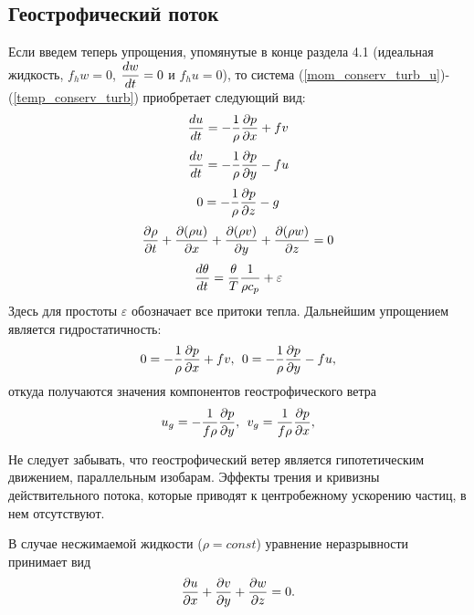 \subsection{{\color{done}Геострофический поток}} \label{section:geostrophic}
    Если введем теперь упрощения, упомянутые в конце раздела 4.1 (идеальная жидкость, $f_h w = 0$, $\displaystyle\frac{d w}{d t}=0$ и $f_h u = 0$), то система (\ref{mom_conserv_turb_u})-(\ref{temp_conserv_turb}) приобретает следующий вид:
    \begin{equation}
    \label{eq:DuDt_geost}
        \displaystyle\frac{d u}{d t} = -\frac{1}{\rho}\displaystyle\frac{\partial p}{\partial x}+fv 
    \end{equation} 
    \begin{equation}
    \label{eq:DvDt_geost}
        \displaystyle\frac{d v}{d t} = -\frac{1}{\rho}\displaystyle\frac{\partial p}{\partial y}-fu 
    \end{equation} 
    \begin{equation}
        0 = -\frac{1}{\rho}\displaystyle\frac{\partial p}{\partial z}-g 
    \end{equation} 
    \begin{equation}
        \displaystyle\frac{\partial \rho}{\partial t} + \displaystyle\frac{\partial (\rho u)}{\partial x} + \displaystyle\frac{\partial (\rho v)}{\partial y} + \displaystyle\frac{\partial (\rho w)}{\partial z} = 0 
    \end{equation} 
    \begin{equation}
    \label{eq:DthetaDt}
        \displaystyle\frac{d \theta}{d t} = \frac{\theta}{T} \frac{1}{\rho c_p} + \varepsilon
    \end{equation} 
    Здесь для простоты $\varepsilon$  обозначает все притоки тепла. Дальнейшим упрощением является гидростатичность:
    \begin{equation}
        0 = -\frac{1}{\rho}\displaystyle\frac{\partial p}{\partial x}+fv, \:\: 0 = -\frac{1}{\rho}\displaystyle\frac{\partial p}{\partial y}-fu,  
    \end{equation} 
    откуда получаются значения компонентов геострофического ветра 
    \begin{equation}
        u_g = -\frac{1}{f \rho}\displaystyle\frac{\partial p}{\partial y}, \:\: v_g = \frac{1}{f \rho}\displaystyle\frac{\partial p}{\partial x},  
    \end{equation} 
    \begin{info}
    Не следует забывать, что геострофический ветер является гипотетическим движением, параллельным  изобарам. Эффекты трения и кривизны действительного потока, которые приводят к центробежному ускорению частиц, в нем отсутствуют.
    \end{info}

    В случае несжимаемой жидкости ($\rho=const$) уравнение неразрывности принимает вид
    \begin{equation}
        \displaystyle\frac{\partial u}{\partial x}+\displaystyle\frac{\partial v}{\partial y}+\displaystyle\frac{\partial w}{\partial z}=0.  
    \end{equation} 

